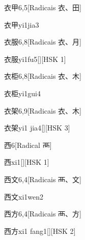 \begin{entry}{衣甲}{6,5}[Radicais ⾐、⽥]
  \begin{phonetics}{衣甲}{yi1jia3}
  \end{phonetics}
\end{entry}

\begin{entry}{衣服}{6,8}[Radicais ⾐、⽉]
  \begin{phonetics}{衣服}{yi1fu5}[][HSK 1]
  \end{phonetics}
\end{entry}

\begin{entry}{衣柜}{6,8}[Radicais ⾐、⽊]
  \begin{phonetics}{衣柜}{yi1gui4}
  \end{phonetics}
\end{entry}

\begin{entry}{衣架}{6,9}[Radicais ⾐、⽊]
  \begin{phonetics}{衣架}{yi1 jia4}[][HSK 3]
  \end{phonetics}
\end{entry}

\begin{entry}{西}{6}[Radical ⾑]
  \begin{phonetics}{西}{xi1}[][HSK 1]
  \end{phonetics}
\end{entry}

\begin{entry}{西文}{6,4}[Radicais ⾑、⽂]
  \begin{phonetics}{西文}{xi1wen2}
  \end{phonetics}
\end{entry}

\begin{entry}{西方}{6,4}[Radicais ⾑、⽅]
  \begin{phonetics}{西方}{xi1 fang1}[][HSK 2]
  \end{phonetics}
\end{entry}

